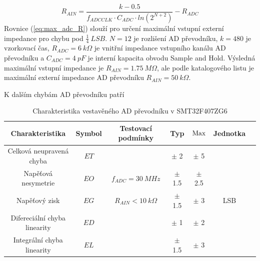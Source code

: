 \begin{equation} \label{eq:max_adc_R}
    R_{AIN} = \frac{k - 0.5}{f_{ADCCLK} \cdot C_{ADC} \cdot ln(2^{N+2})} - R_{ADC}
\end{equation}
Rovnice (\ref{eq:max_adc_R}) slouží pro určení maximální vstupní externí impedance pro chybu pod $\frac{1}{4} \ LSB$. $N = 12$ je rozlišení AD převodníku, $k = 480$ je vzorkovací čas, $R_{ADC} = 6 \ k\Omega$ je vnitřní impedance vstupního kanálu AD převodníku a
$C_{ADC} = 4 \ pF$ je interní kapacita obvodu Sample and Hold. Výsledná maximální vstupní impedance je $R_{AIN} = 1.75 \ M\Omega$, ale podle katalogového listu je maximální externí impedance AD převodníku $R_{AIN} = 50 \ k\Omega$.
\par
K dalším chybám AD převodníku patří

\begin{table}[H]
    \label{tab:stm_adc_error}
    \caption{Charakteristika vestavěného AD převodníku v SMT32F407ZG6}
    \hspace*{-1.3cm}
    \begin{ctucolortab}
        \begin{tabular}{ccccccc}
            \toprule
            Charakteristika               & Symbol & Testovací podmínky       & Typ       & $\textnormal{Max}$ & Jednotka & \\ \midrule
            Celková neupravená chyba      & $ET$   &                          & $\pm$ 2   & $\pm$ 5            &          & \\
            Napěťová nesymetrie           & $EO$   & $f_{ADC} = 30 \ MHz$     & $\pm$ 1.5 & $\pm$ 2.5          &          & \\
            Napěťový zisk                 & $EG$   & $R_{AIN} < 10 \ k\Omega$ & $\pm$ 1.5 & $\pm$ 3            & LSB      & \\
            Difereciální  chyba linearity & $ED$   &                          & $\pm$ 1   & $\pm$ 2            &          & \\
            Integrální chyba linearity    & $EL$   &                          & $\pm$ 1.5 & $\pm$ 3            &          & \\
            \bottomrule
        \end{tabular}
    \end{ctucolortab}
\end{table}


